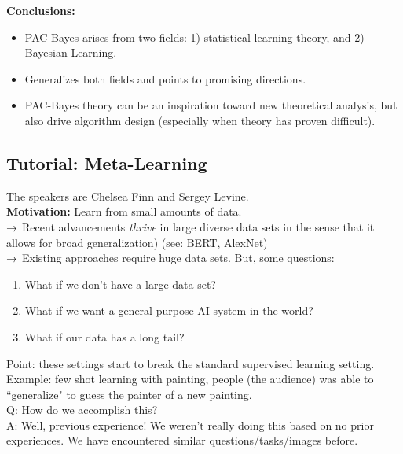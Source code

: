 {\bf Conclusions:}
\begin{itemize}
    \item PAC-Bayes arises from two fields: 1) statistical learning theory, and 2) Bayesian Learning.
    \item Generalizes both fields and points to promising directions.
    \item PAC-Bayes theory can be an inspiration toward new theoretical analysis, but also drive algorithm design (especially when theory has proven difficult).
\end{itemize}


\spacerule

\subsection{Tutorial: Meta-Learning}

The speakers are Chelsea Finn and Sergey Levine. \\

{\bf Motivation:} Learn from small amounts of data. \\

$\rightarrow$ Recent advancements {\it thrive} in large diverse data sets in the sense that it allows for broad generalization) (see: BERT, AlexNet) \\

$\rightarrow$ Existing approaches require huge data sets. But, some questions:
\begin{enumerate}
\item  What if we don't have a large data set?
\item What if we want a general purpose AI system in the world?
\item What if our data has a long tail?
\end{enumerate}

Point: these settings start to break the standard supervised learning setting. \\

Example: few shot learning with painting, people (the audience) was able to ``generalize" to guess the painter of a new painting. \\

Q: How do we accomplish this? \\

A: Well, previous experience! We weren't really doing this based on no prior experiences. We have encountered similar questions/tasks/images before. \\


